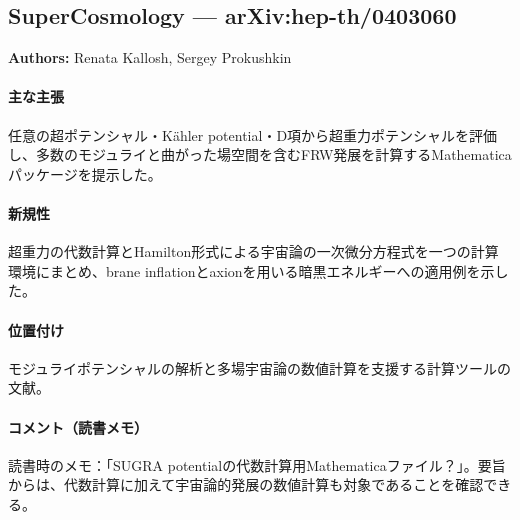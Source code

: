 \subsection{SuperCosmology --- arXiv:hep-th/0403060}

\textbf{Authors:} Renata Kallosh, Sergey Prokushkin

\paragraph{主な主張}
任意の超ポテンシャル・K\"ahler potential・D項から超重力ポテンシャルを評価し、多数のモジュライと曲がった場空間を含むFRW発展を計算するMathematicaパッケージを提示した\cite{Kallosh:2004rs}。

\paragraph{新規性}
超重力の代数計算とHamilton形式による宇宙論の一次微分方程式を一つの計算環境にまとめ、brane inflationとaxionを用いる暗黒エネルギーへの適用例を示した。

\paragraph{位置付け}
モジュライポテンシャルの解析と多場宇宙論の数値計算を支援する計算ツールの文献。

\paragraph{コメント（読書メモ）}
読書時のメモ：「SUGRA potentialの代数計算用Mathematicaファイル？」。要旨からは、代数計算に加えて宇宙論的発展の数値計算も対象であることを確認できる。
